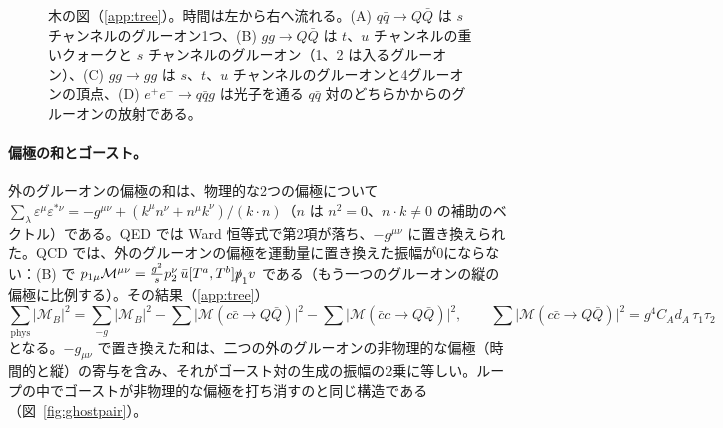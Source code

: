 \documentclass[a4paper,10pt]{ltjsarticle}
\begin{document}
\begin{figure}[tbp]
\caption{木の図（\ref{app:tree}）。時間は左から右へ流れる。(A) $q\bar q\to Q\bar Q$ は $s$ チャンネルのグルーオン1つ、(B) $gg\to Q\bar Q$ は $t$、$u$ チャンネルの重いクォークと $s$ チャンネルのグルーオン（1、2 は入るグルーオン）、(C) $gg\to gg$ は $s$、$t$、$u$ チャンネルのグルーオンと4グルーオンの頂点、(D) $e^+e^-\to q\bar qg$ は光子を通る $q\bar q$ 対のどちらかからのグルーオンの放射である。}
\label{fig:tree}
\end{figure}

\paragraph{偏極の和とゴースト。}外のグルーオンの偏極の和は、物理的な2つの偏極について $\sum_\lambda\varepsilon^\mu\varepsilon^{*\nu}=-g^{\mu\nu}+(k^\mu n^\nu+n^\mu k^\nu)/(k\cdot n)$（$n$ は $n^2=0$、$n\cdot k\ne0$ の補助のベクトル）である。QED では Ward 恒等式で第2項が落ち、$-g^{\mu\nu}$ に置き換えられた。QCD では、外のグルーオンの偏極を運動量に置き換えた振幅が0にならない：(B) で $p_{1\mu}\mathcal M^{\mu\nu}=\frac{g^2}{s}p_2^\nu\,\bar u[T^a,T^b]\slashed p_1v$ である（もう一つのグルーオンの縦の偏極に比例する）。その結果（\ref{app:tree}）
\begin{equation}
\sum_{\mathrm{phys}}|\mathcal M_B|^2=\sum_{-g}|\mathcal M_B|^2-\sum\bigl|\mathcal M(c\bar c\to Q\bar Q)\bigr|^2-\sum\bigl|\mathcal M(\bar cc\to Q\bar Q)\bigr|^2,\qquad
\sum\bigl|\mathcal M(c\bar c\to Q\bar Q)\bigr|^2=g^4C_Ad_A\,\tau_1\tau_2
\label{eq:ghostsum}
\end{equation}
となる。$-g_{\mu\nu}$ で置き換えた和は、二つの外のグルーオンの非物理的な偏極（時間的と縦）の寄与を含み、それがゴースト対の生成の振幅の2乗に等しい。ループの中でゴーストが非物理的な偏極を打ち消すのと同じ構造である（図~\ref{fig:ghostpair}）。
\end{document}
